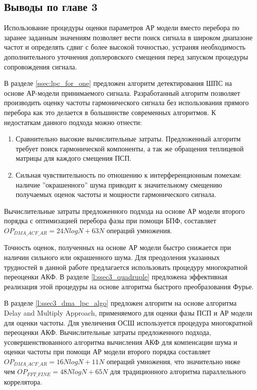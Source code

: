 \subsection*{Выводы по главе 3}

Использование процедуры оценки параметров АР модели вместо перебора по заранее заданным значениям позволяет вести поиск сигнала
в широком диапазоне частот и определять сдвиг с более высокой точностью, устраняя необходимость дополнительного уточнения
доплеровского смещения перед запуском процедуры сопровождения сигнала.

В разделе \ref{ssec:lpc_for_one} предложен алгоритм детектирования ШПС на основе АР-модели принимаемого сигнала.
Разработанный алгоритм позволяет производить оценку частоты гармонического сигнала без использования прямого
перебора как это делается в большинстве современных алгоритмов. К недостаткам данного подхода можно отнести: 
\begin{enumerate}
	\item Сравнительно высокие вычислительные затраты. Предложенный алгоритм требует поиск гармонической
		компоненты, а так же обращения теплицевой матрицы для каждого смещения ПСП.
	\item Сильная чувствительность по отношению к интерференционным помехам: наличие
		''окрашенного'' шума приводит к значительному смещению получаемых
		оценок частоты и мощности гармонического сигнала.
\end{enumerate}

Вычислительные затраты предложенного подхода на основе АР модели второго порядка с оптимизацией перебора фазы при помощи БПФ,
составляет ${OP_{DMA\_ACF\_AR}=24NlogN+63N}$ операций умножения.

Точность оценок, полученных на основе АР модели быстро снижается при наличии сильного или окрашенного шума. Для преодоления указанных
трудностей в данной работе предлагается использовать процедуру многократной переоценки АКФ. В разделе \ref{l:ssec3_quadruple} предложена
эффективная реализация этой процедуры на основе алгоритма быстрого преобразования Фурье.

В разделе \ref{l:ssec3_dma_lpc_algo} предложен алгоритм на основе алгоритма Delay and Multiply Approach, применяемого для оценки фазы ПСП и 
АР модели для оценки частоты. Для увеличения ОСШ используется процедура многократной переоценки АКФ.
Вычислительные затраты предложенного подхода,
усовершенствованного алгоритма вычисления АКФ для компенсации шума и оценки частоты при помощи АР модели второго порядка составляет
${OP_{DMA\_ACF\_AR}=16NlogN+11N}$
операций умножения, что значительно ниже чем ${OP_{FFT\_FINE}=48NlogN+65N}$ для традиционного алгоритма параллельного коррелятора.

\newpage
